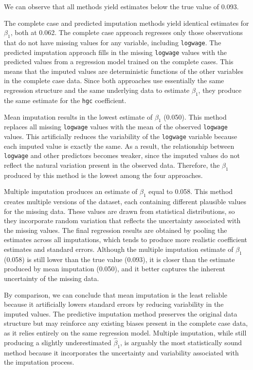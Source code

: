 \documentclass{article}
\begin{document}
\begin{table}[ht]
\begin{tabular}{lcccc}
\bottomrule
\end{tabular}
\end{table}
We can observe that all methods yield estimates below the true value of 0.093. 

The complete case and predicted imputation methods yield identical estimates for $\beta_1$, both at 0.062. The complete case approach regresses only those observations that do not have missing values for any variable, including \texttt{logwage}. The predicted imputation approach fills in the missing \texttt{logwage} values with the predicted values from a regression model trained on the complete cases. This means that the imputed values are deterministic functions of the other variables in the complete case data. Since both approaches use essentially the same regression structure and the same underlying data to estimate $\beta_1$, they produce the same estimate for the \texttt{hgc} coefficient.

Mean imputation results in the lowest estimate of $\beta_1$ (0.050). This method replaces all missing \texttt{logwage} values with the mean of the observed \texttt{logwage} values. This artificially reduces the variability of the \texttt{logwage} variable because each imputed value is exactly the same. As a result, the relationship between \texttt{logwage} and other predictors becomes weaker, since the imputed values do not reflect the natural variation present in the observed data. Therefore, the $\beta_1$ produced by this method is the lowest among the four approaches.

Multiple imputation produces an estimate of $\beta_1$ equal to 0.058. This method creates multiple versions of the dataset, each containing different plausible values for the missing data. These values are drawn from statistical distributions, so they incorporate random variation that reflects the uncertainty associated with the missing values. The final regression results are obtained by pooling the estimates across all imputations, which tends to produce more realistic coefficient estimates and standard errors. Although the multiple imputation estimate of $\beta_1$ (0.058) is still lower than the true value (0.093), it is closer than the estimate produced by mean imputation (0.050), and it better captures the inherent uncertainty of the missing data.

By comparison, we can conclude that mean imputation is the least reliable because it artificially lowers standard errors by reducing variability in the imputed values. The predictive imputation method preserves the original data structure but may reinforce any existing biases present in the complete case data, as it relies entirely on the same regression model. Multiple imputation, while still producing a slightly underestimated $\hat{\beta}_1$, is arguably the most statistically sound method because it incorporates the uncertainty and variability associated with the imputation process.
\end{document}

